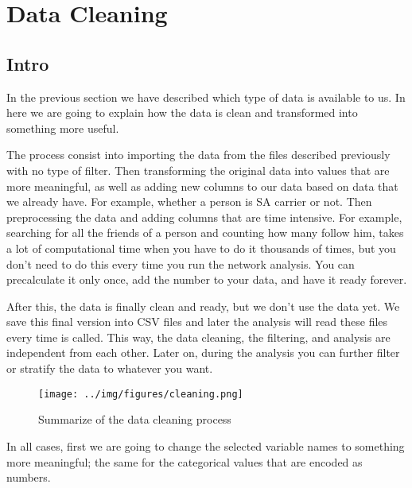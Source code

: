 \chapter{Data Cleaning}\label{ch:datacleaning}

\section{Intro}

In the previous section we have described which type of data is available to us. In here we are going to explain how the data is clean and transformed into something more useful.\vspace{3 mm}

The process consist into importing the data from the files described previously with no type of filter. Then transforming the original data into values that are more meaningful, as well as adding new columns to our data based on data that we already have. For example, whether a person is SA carrier or not. Then preprocessing the data and adding columns that are time intensive. For example, searching for all the friends of a person and counting how many follow him, takes a lot of computational time when you have to do it thousands of times, but you don't need to do this every time you run the network analysis. You can precalculate it only once, add the number to your data, and have it ready forever.\vspace{3 mm}

After this, the data is finally clean and ready, but we don't use the data yet. We save this final version into CSV files and later the analysis will read these files every time is called. This way, the data cleaning, the filtering, and analysis are independent from each other. Later on, during the analysis you can further filter or stratify the data to whatever you want.\vspace{3 mm}

\begin{figure}[H]
{
    \centering

    \label{fig:Data_cleaning_summary}

    \texttt{[image: ../img/figures/cleaning.png]}
    \caption{Summarize of the data cleaning process}
}
\medskip
\end{figure}

In all cases, first we are going to change the selected variable names to something more meaningful; the same for the categorical values that are encoded as numbers.\vspace{3 mm}

